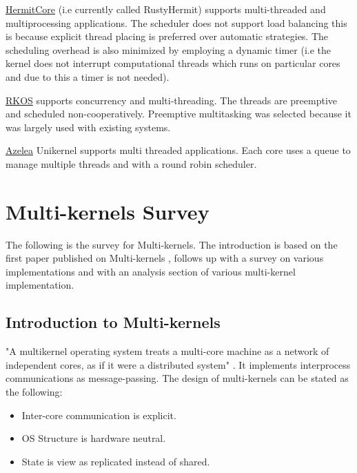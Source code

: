 \underline{HermitCore} (i.e currently called RustyHermit) supports multi-threaded and 
multiprocessing applications. The scheduler does not support load balancing 
this is because explicit thread placing is preferred over automatic 
strategies. The scheduling overhead is also minimized by employing a 
dynamic timer (i.e the kernel does not interrupt computational threads which runs on 
particular cores and due to this a timer is not needed).
\hfill \break

\underline{RKOS} supports concurrency and multi-threading. The threads are preemptive and scheduled non-cooperatively.
Preemptive multitasking was selected because it was largely used with existing systems. 
\hfill \break

\underline{Azelea} Unikernel supports multi threaded applications. Each core uses a queue to manage multiple threads 
and with a round robin scheduler. 






\section[Multi-kernels]{Multi-kernels Survey}
\label{Multi-kernels}
The following is the survey for Multi-kernels. The introduction is 
based on the first paper published on Multi-kernels \cite{multi_kernel_first_paper},
follows up with a survey on various implementations and with an 
analysis section of various multi-kernel implementation. 


\subsection{Introduction to Multi-kernels}
"A multikernel operating system treats a multi-core machine as a network of independent cores, as if it were a distributed system" \cite{Multi_kernel_wikipedia}.
It implements interprocess communications as message-passing. The design of multi-kernels can be stated as the following: 
\begin{itemize}
  \item Inter-core communication is explicit. 
  \item OS Structure is hardware neutral.
  \item State is view as replicated instead of shared.
\end{itemize}

